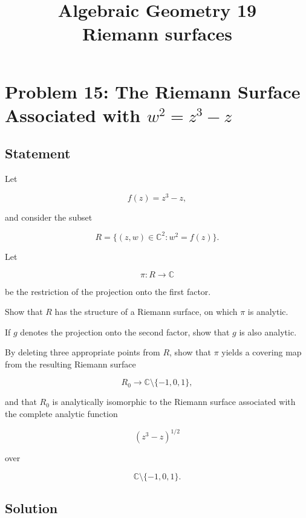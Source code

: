 \documentclass[12pt,a4paper]{article}
\theoremstyle{notespace}
\begin{document}
\title{Algebraic Geometry 19\\
	\large Riemann surfaces}
\author{}
\date{}

	\maketitle
	

	\setcounter{section}{0}

\tableofcontents

	\clearpage


\section{Problem 15: The Riemann Surface Associated with \texorpdfstring{$w^2=z^3-z$}{w²=z³-z}}

\subsection*{Statement}

Let

\[
f(z)=z^3-z,
\]

and consider the subset

\[
R
=
\{(z,w)\in\mathbb C^2:w^2=f(z)\}.
\]

Let

\[
\pi:R\to\mathbb C
\]

be the restriction of the projection onto the first factor.

Show that \(R\) has the structure of a Riemann surface, on which \(\pi\) is analytic.

If \(g\) denotes the projection onto the second factor, show that \(g\) is also analytic.

By deleting three appropriate points from \(R\), show that \(\pi\) yields a covering map from the resulting Riemann surface

\[
R_0
\to
\mathbb C\setminus\{-1,0,1\},
\]

and that \(R_0\) is analytically isomorphic to the Riemann surface associated with the complete analytic function

\[
(z^3-z)^{1/2}
\]

over

\[
\mathbb C\setminus\{-1,0,1\}.
\]

\subsection*{Solution}
\end{document}
